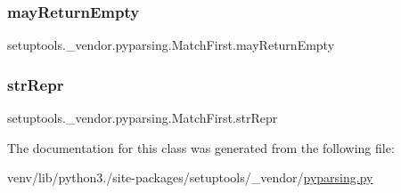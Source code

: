 \subsubsection{\texorpdfstring{may\+Return\+Empty}{mayReturnEmpty}}
{\footnotesize\ttfamily setuptools.\+\_\+vendor.\+pyparsing.\+Match\+First.\+may\+Return\+Empty}

\mbox{\label{classsetuptools_1_1__vendor_1_1pyparsing_1_1MatchFirst_a78d1963e4344e706db983ccaa0aa3a2a}} 
\subsubsection{\texorpdfstring{str\+Repr}{strRepr}}
{\footnotesize\ttfamily setuptools.\+\_\+vendor.\+pyparsing.\+Match\+First.\+str\+Repr}



The documentation for this class was generated from the following file\+:\begin{DoxyCompactItemize}
\item 
venv/lib/python3./site-\/packages/setuptools/\+\_\+vendor/\hyperlink{setuptools_2__vendor_2pyparsing_8py}{pyparsing.\+py}\end{DoxyCompactItemize}
